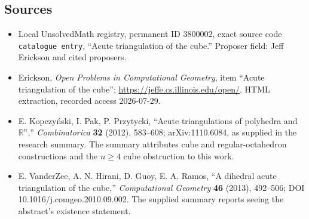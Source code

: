 \documentclass[11pt]{article}
\newcommand{\R}{\mathbb{R}}
\begin{document}
\subsection{Sources}
\begin{itemize}
\item Local UnsolvedMath registry, permanent ID \(3800002\), exact source code \texttt{catalogue entry}, ``Acute triangulation of the cube.'' Proposer field: Jeff Erickson and cited proposers.
\item Erickson, \emph{Open Problems in Computational Geometry}, item ``Acute triangulation of the cube''; \url{https://jeffe.cs.illinois.edu/open/}. HTML extraction, recorded access 2026-07-29.
\item E. Kopczyński, I. Pak, P. Przytycki, ``Acute triangulations of polyhedra and \(\R^n\),'' \emph{Combinatorica} \textbf{32} (2012), 583--608; arXiv:1110.6084, as supplied in the research summary. The summary attributes cube and regular-octahedron constructions and the \(n\ge4\) cube obstruction to this work.
\item E. VanderZee, A. N. Hirani, D. Guoy, E. A. Ramos, ``A dihedral acute triangulation of the cube,'' \emph{Computational Geometry} \textbf{46} (2013), 492--506; DOI 10.1016/j.comgeo.2010.09.002. The supplied summary reports seeing the abstract's existence statement.
\end{itemize}
\end{document}
